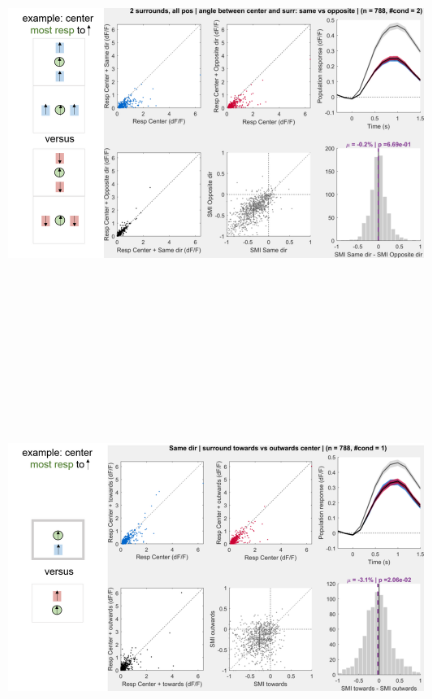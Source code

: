 \begin{figure}[H] \centering \includegraphics[width=11cm,height=11cm,keepaspectratio]{Figures/7.Results/population/sel/diagrams/18.png} 
\end{figure}

\begin{figure}[H] \centering \includegraphics[width=11cm,height=11cm,keepaspectratio]{Figures/7.Results/population/sel/diagrams/19.png} 
\end{figure}


